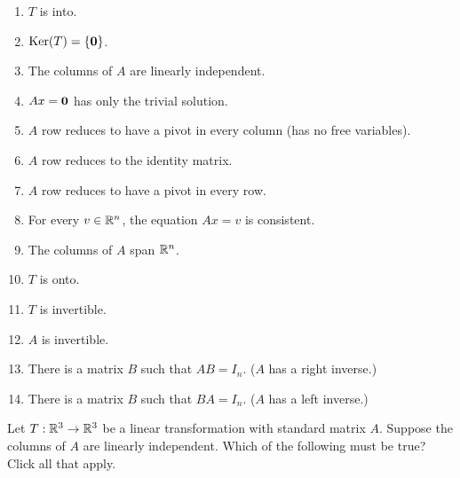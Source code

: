 \begin{enumerate}
\item $T$ is into.
\item $\mathrm{Ker}(T) = \{ \mathbf{0} \}$.  
\item The columns of $A$ are linearly independent. 
\item $Ax = \mathbf{0}$ has only the trivial solution.
\item $A$ row reduces to have a pivot in every column (has no free variables).  
\item $A$ row reduces to the identity matrix.  
\item $A$ row reduces to have a pivot in every row.  
\item For every $v\in \mathbb R^n$, the equation $Ax = v$ is consistent.
\item The columns of $A$ span $\mathbb R^n$.  
\item $T$ is onto.  
\item $T$ is invertible.
\item $A$ is invertible.
\item There is a matrix $B$ such that $AB = I_n$.  ($A$ has a right inverse.)
\item There is a matrix $B$ such that $BA = I_n$.  ($A$ has a left inverse.)  

\end{enumerate}



\endedxtext


\endedxvertical




Let $T: \mathbb R^3 \rightarrow \mathbb R^3$ be a linear transformation with standard matrix $A$.  Suppose the columns of $A$ are linearly
independent.  Which of the following must be true?  Click all that apply.  




\endedxproblem


\endedxvertical
